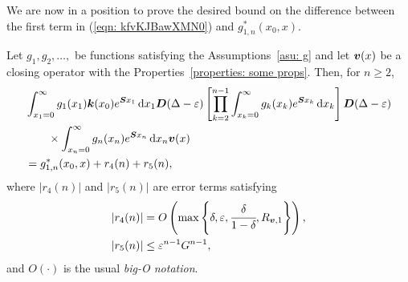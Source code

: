 We are now in a position to prove the desired bound on the difference between the first term in (\ref{eqn: kfvKJBawXMN0}) and \(g^*_{1,n}(x_0,x)\).
\begin{lem}\label{lem: lst convergence}
	Let \(g_1,g_2,\dots,\) be functions satisfying the Assumptions~\ref{asu: g} and let \(\boldsymbol v(x)\) be a closing operator with the Properties~\ref{properties: some props}. Then, for \(n\geq 2\),  
	\begin{align}
		&\int_{x_1=0}^\infty g_1(x_1) \boldsymbol k(x_0) e^{\boldsymbol{S}x_1}\, \mathrm{d} x_1 \boldsymbol D(\Delta-\varepsilon)
            	\left[\prod_{k=2}^{n-1}\int_{x_k=0}^\infty g_k(x_k) e^{\boldsymbol{S}x_k} \, \mathrm{d} x_k \right]
		\boldsymbol D(\Delta-\varepsilon) \nonumber 
		\\&\qquad\times\int_{x_n=0}^\infty g_{n}(x_n) e^{\boldsymbol{S}x_n} \, \mathrm{d} x_n {\boldsymbol v}(x) \nonumber 
		\\& =g^{*}_{1,n}(x_0,x) + r_4(n) + r_5(n), \label{eqn: rhs g 2}
	\end{align}
	where \(|r_4(n)|\) and \(|r_5(n)|\) are error terms satisfying 
	\begin{align*}
		|r_4(n)|&= O\left(\max\left\{\delta,\varepsilon,\cfrac{\delta}{1-\delta},R_{{\boldsymbol v},1}\right\}\right),
		\\|r_5(n)| &\leq \varepsilon^{n-1}G^{n-1},
	\end{align*}
	and \(O(\cdot)\) is the usual \emph{big-O notation}.
\end{lem}
